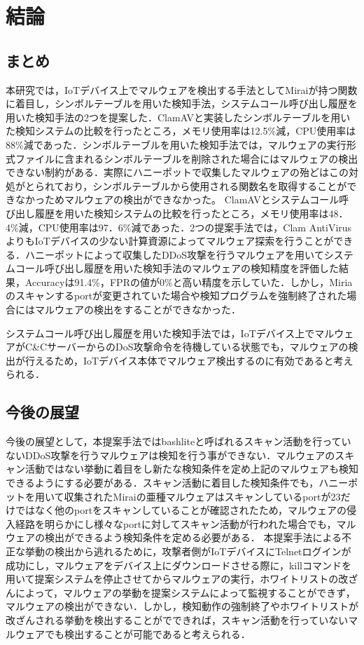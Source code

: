 \chapter{結論}

\section{まとめ}
本研究では，IoTデバイス上でマルウェアを検出する手法としてMiraiが持つ関数に着目し，シンボルテーブルを用いた検知手法，システムコール呼び出し履歴を用いた検知手法の2つを提案した．ClamAVと実装したシンボルテーブルを用いた検知システムの比較を行ったところ，メモリ使用率は12.5\%減，CPU使用率は88\%減であった．シンボルテーブルを用いた検知手法では，マルウェアの実行形式ファイルに含まれるシンボルテーブルを削除された場合にはマルウェアの検出できない制約がある．実際にハニーポットで収集したマルウェアの殆どはこの対処がとられており，シンボルテーブルから使用される関数名を取得することができなかっためマルウェアの検出ができなかった。
ClamAVとシステムコール呼び出し履歴を用いた検知システムの比較を行ったところ，メモリ使用率は48．4\%減，CPU使用率は97．6\%減であった．2つの提案手法では，Clam AntiVirusよりもIoTデバイスの少ない計算資源によってマルウェア探索を行うことができる．ハニーポットによって収集したDDoS攻撃を行うマルウェアを用いてシステムコール呼び出し履歴を用いた検知手法のマルウェアの検知精度を評価した結果，Accuracyは91.4\%，FPRの値が0\%と高い精度を示していた．しかし，Miriaのスキャンするportが変更されていた場合や検知プログラムを強制終了された場合にはマルウェアの検出をすることができなかった．\par
システムコール呼び出し履歴を用いた検知手法では，IoTデバイス上でマルウェアがC\&CサーバーからのDoS攻撃命令を待機している状態でも，マルウェアの検出が行えるため，IoTデバイス本体でマルウェア検出するのに有効であると考えられる．

\section{今後の展望}
今後の展望として，本提案手法ではbashliteと呼ばれるスキャン活動を行っていないDDoS攻撃を行うマルウェアは検知を行う事ができない．マルウェアのスキャン活動ではない挙動に着目をし新たな検知条件を定め上記のマルウェアも検知できるようにする必要がある．スキャン活動に着目した検知条件でも，ハニーポットを用いて収集されたMiraiの亜種マルウェアはスキャンしているportが23だけではなく他のportをスキャンしていることが確認されたため，マルウェアの侵入経路を明らかにし様々なportに対してスキャン活動が行われた場合でも，マルウェアの検出ができるよう検知条件を定める必要がある．
本提案手法による不正な挙動の検出から逃れるために，攻撃者側がIoTデバイスにTelnetログインが成功にし，マルウェアをデバイス上にダウンロードさせる際に，killコマンドを用いて提案システムを停止させてからマルウェアの実行，ホワイトリストの改ざんによって，マルウェアの挙動を提案システムによって監視することができず，マルウェアの検出ができない．しかし，検知動作の強制終了やホワイトリストが改ざんされる挙動を検出することがでできれば，スキャン活動を行っていないマルウェアでも検出することが可能であると考えられる．
